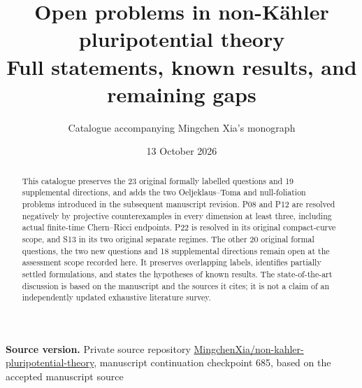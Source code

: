 \documentclass[11pt]{article}
\title{Open problems in non-K\"ahler pluripotential theory\\
\large Full statements, known results, and remaining gaps}
\author{Catalogue accompanying Mingchen Xia's monograph}
\date{13 October 2026}
\begin{document}
\maketitle
\begin{abstract}
This catalogue preserves the 23 original formally labelled questions and 19 supplemental directions, and adds the two Oeljeklaus--Toma and null-foliation problems introduced in the subsequent manuscript revision. P08 and P12 are resolved negatively by projective counterexamples in every dimension at least three, including actual finite-time Chern--Ricci endpoints. P22 is resolved in its original compact-curve scope, and S13 in its two original separate regimes. The other 20 original formal questions, the two new questions and 18 supplemental directions remain open at the assessment scope recorded here. It preserves overlapping labels, identifies partially settled formulations, and states the hypotheses of known results. The state-of-the-art discussion is based on the manuscript and the sources it cites; it is not a claim of an independently updated exhaustive literature survey.
\end{abstract}
\noindent\textbf{Source version.} Private source repository
\href{https://github.com/MingchenXia/non-kahler-pluripotential-theory}{MingchenXia/non-kahler-pluripotential-theory}, manuscript continuation checkpoint 685, based on the accepted manuscript source
\end{document}
